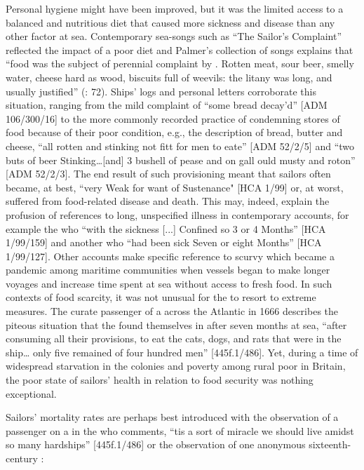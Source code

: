   Personal hygiene might have been improved, but it was the limited access to a balanced and nutritious diet that caused more sickness and disease than any other factor at sea. Contemporary sea-songs such as “The Sailor’s Complaint” reflected the impact of a poor diet and Palmer’s collection of songs explains that “food was the subject of perennial complaint by . Rotten meat, sour beer, smelly water, cheese hard as wood, biscuits full of weevils: the litany was long, and usually justified” (\citealt{Palmer1986}: 72). Ships’ logs and personal letters corroborate this situation, ranging from the mild complaint of “some bread decay'd” [ADM 106/300/16] to the more commonly recorded practice of condemning stores of food because of their poor condition, e.g., the description of bread, butter and cheese, “all rotten and stinking not fitt for men to eate” [ADM 52/2/5] and “two buts of beer Stinking…[and] 3 bushell of pease and on gall ould musty and roton” [ADM 52/2/3]. The end result of such provisioning meant that sailors often became, at best, “very Weak for want of Sustenance" [HCA 1/99] or, at worst, suffered from food-related disease and death. This may, indeed, explain the profusion of references to long, unspecified illness in contemporary accounts, for example the  who “with the sickness [...] Confined so 3 or 4 Months” [HCA 1/99/159] and another who “had been sick Seven or eight Months” [HCA 1/99/127]. Other accounts make specific reference to scurvy which became a pandemic among maritime communities when vessels began to make longer voyages and increase time spent at sea without access to fresh food. In such contexts of food scarcity, it was not unusual for the  to resort to extreme measures. The curate passenger of a  across the Atlantic in 1666 describes the piteous situation that the  found themselves in after seven months at sea, “after consuming all their provisions, to eat the cats, dogs, and rats that were in the ship… only five remained of four hundred men” [445f.1/486]. Yet, during a time of widespread starvation in the colonies and poverty among rural poor in Britain, the poor state of sailors’ health in relation to food security was nothing exceptional. 

  Sailors’ mortality rates are perhaps best introduced with the observation of a passenger on a   in the  who comments, “tis a sort of miracle we should live amidst so many hardships” [445f.1/486] or the observation of one anonymous sixteenth-century :

